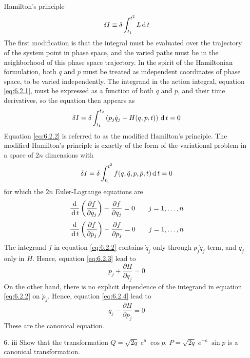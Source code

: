 \documentclass[12pt]{article}
\begin{document}
\begin{soln}
    Hamilton's principle
    \begin{equation}
        \delta I\equiv\delta \int_{t_1}^{t^2} L \,\mathrm{d}\, t\label{eq:6.2.1}
    \end{equation}
    The first modification is that the integral must be evaluated over the trajectory of the system point in phase space, and the varied paths
must be in the neighborhood of this phase space trajectory. In the spirit of the
Hamiltonian formulation, both \(q\) and \(p\) must be treated as independent coordinates of phase space, to be varied independently. The integrand in the
action integral, equation \eqref{eq:6.2.1}, must be expressed as a function of both \(q\) and \(p\), and
their time derivatives, so the equation then appears as
\begin{equation}
    \delta I=\delta \int_{t_1}^{t_2}\left( p_j\dot{q}_j-H(q,p,t) \right)\,\mathrm{d}\, t=0\label{eq:6.2.2} 
\end{equation}
Equation \eqref{eq:6.2.2} is referred to as the modified Hamilton's principle. The modified Hamilton's principle is exactly of the form of the variational problem in a space of \(2n\) dimensions with
\[\delta I=\delta \int_{t_1}^{t^2}f(q,\dot{q},p,\dot{p},t)\,\mathrm{d}\, t=0\]
for which the \(2n\) Euler-Lagrange equations are
\begin{equation}
    \frac{\,\mathrm{d}\,}{\,\mathrm{d}\, t}\left( \frac{\partial f}{\partial \dot{q}_j} \right)-\frac{\partial f}{\partial q_j}=0\qquad j=1,\dots,n \label{eq:6.2.3}
\end{equation}
\begin{equation}
    \frac{\,\mathrm{d}\,}{\,\mathrm{d}\, t}\left( \frac{\partial f}{\partial \dot{p}_j} \right)-\frac{\partial f}{\partial p_j}=0\qquad j=1,\dots,n \label{eq:6.2.4}
\end{equation}
The integrand \(f\) in equation \eqref{eq:6.2.2} contains \(\dot{q}_j\) only through \(p_j\dot{q}_j\) term, and \(q_j\) only in \(H\). Hence, equation \eqref{eq:6.2.3} lead to
\[\dot{p}_j+\frac{\partial H}{\partial q_j}=0\]
On the other hand, there is no explicit dependence of the integrand in equation \eqref{eq:6.2.2} on \(\dot{p}_j\). Hence, equation \eqref{eq:6.2.4} lead to
\[\dot{q}_j-\frac{\partial H}{\partial p_j}=0\]
These are the canonical equation.
\end{soln}
\begin{prob}{6. iii}
    Show that the transformation \(Q=\sqrt{2q} \;e^a\;\cos p\), \(P=\sqrt{2q} \;e^{-a}\;\sin p\) is a canonical transformation.
\end{prob}
\end{document}
